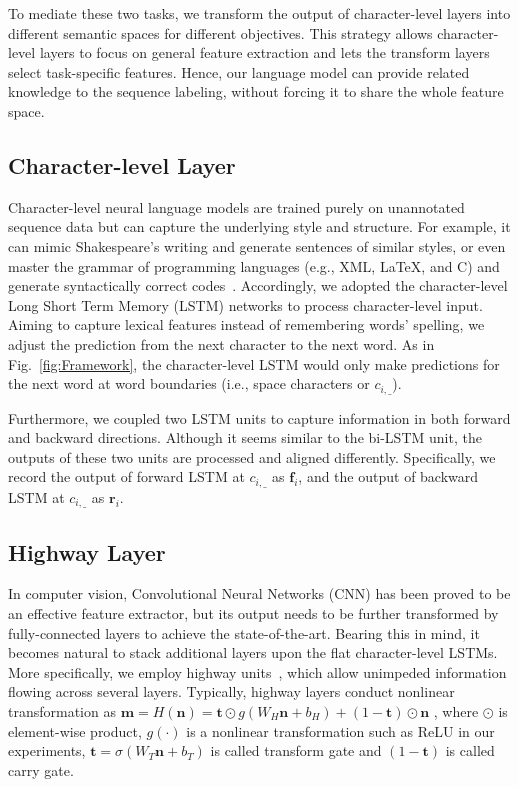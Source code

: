 \documentclass[letterpaper]{article} %
\def \myspace {\_}
\def \f {\mathbf{f}}
\def \m {\mathbf{m}}
\def \n {\mathbf{n}}
\def \r {\mathbf{r}}
\def \t {\mathbf{t}}
\begin{document}
To mediate these two tasks, we transform the output of character-level layers into different semantic spaces 
for different objectives.
This strategy allows character-level layers to focus on general feature extraction and lets the transform layers select task-specific features.
Hence, our language model can provide related knowledge to the sequence labeling, without forcing it to share the whole feature space.

\subsection{Character-level Layer}

Character-level neural language models are trained purely on unannotated sequence data but can capture the underlying style and structure.
For example, it can mimic Shakespeare's writing and generate sentences of similar styles, or even master the grammar of programming languages (e.g., XML, \LaTeX, and C) and generate syntactically correct codes~\cite{rnn-effectiveness-blog}.
Accordingly, we adopted the character-level Long Short Term Memory (LSTM) networks to process character-level input.
Aiming to capture lexical features instead of remembering words' spelling,
we adjust the prediction from the next character to the next word.
As in Fig.~\ref{fig:Framework}, the character-level LSTM would only make predictions for the next word at word boundaries (i.e., space characters or $c_{i, \myspace}$).

Furthermore, we coupled two LSTM units to capture information in both forward and backward directions.
Although it seems similar to the bi-LSTM unit, the outputs of these two units are processed and aligned differently.
Specifically, we record the output of forward LSTM at $c_{i, \myspace}$ as $\f_{i}$, and the output of backward LSTM at $c_{i, \myspace}$ as $\r_{i}$.

\subsection{Highway Layer}

In computer vision, Convolutional Neural Networks (CNN) has been proved to be an effective feature extractor, but its output needs to be further transformed by fully-connected layers to achieve the state-of-the-art.
Bearing this in mind, it becomes natural to stack additional layers upon the flat character-level LSTMs.
More specifically, we employ highway units~\cite{srivastava2015highway}, which allow unimpeded information flowing across several layers.
Typically, highway layers conduct nonlinear transformation as
$
\m = H(\n) = \t \odot g(W_H \n + b_H) + (1-\t) \odot \n
$
, where $\odot$ is element-wise product, $g(\cdot)$ is a nonlinear transformation such as ReLU in our experiments, $\t=\sigma(W_T \n + b_T)$ is called transform gate and $(1-\t)$ is called carry gate.
\end{document}
